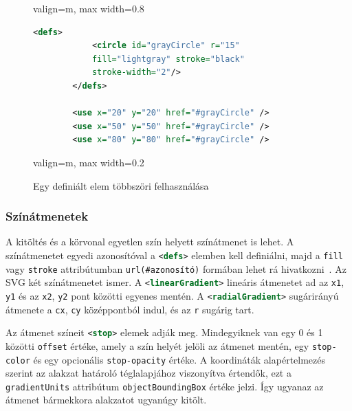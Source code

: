 \begin{figure}[H] \centering
    \begin{adjustbox}{valign=m, max width=0.8\textwidth}
        \begin{lstlisting}[language=XML]
        <defs>
            <circle id="grayCircle" r="15"
            fill="lightgray" stroke="black"
            stroke-width="2"/>
        </defs>

        <use x="20" y="20" href="#grayCircle" />
        <use x="50" y="50" href="#grayCircle" />
        <use x="80" y="80" href="#grayCircle" />
        \end{lstlisting}
    \end{adjustbox}
    \hfill
    \begin{adjustbox}{valign=m, max width=0.2\textwidth}
        
    \end{adjustbox}
    \caption{Egy definiált elem többszöri felhasználása}
    \label{fig:example_defs}
\end{figure}

\subsubsection{Színátmenetek}
\label{sub:gradients}

A kitöltés és a körvonal egyetlen szín helyett színátmenet is lehet. A színátmenetet egyedi azonosítóval a \lstinline[language=XML]|<defs>| elemben kell definiálni, majd a \texttt{fill} vagy \texttt{stroke} attribútumban \texttt{url(\#azonosító)} formában lehet rá hivatkozni~\cite{w3c-svg-pservers}. Az SVG két színátmenetet ismer. A \lstinline[language=XML]|<linearGradient>| lineáris átmenetet ad az \texttt{x1}, \texttt{y1} és az \texttt{x2}, \texttt{y2} pont közötti egyenes mentén. A \lstinline[language=XML]|<radialGradient>| sugárirányú átmenete a \texttt{cx}, \texttt{cy} középpontból indul, és az \texttt{r} sugárig tart.

Az átmenet színeit \lstinline[language=XML]|<stop>| elemek adják meg. Mindegyiknek van egy 0 és 1 közötti \texttt{offset} értéke, amely a szín helyét jelöli az átmenet mentén, egy \texttt{stop-color} és egy opcionális \texttt{stop-opacity} értéke. A koordináták alapértelmezés szerint az alakzat határoló téglalapjához viszonyítva értendők, ezt a \texttt{gradientUnits} attribútum \texttt{objectBoundingBox} értéke jelzi. Így ugyanaz az átmenet bármekkora alakzatot ugyanúgy kitölt.

